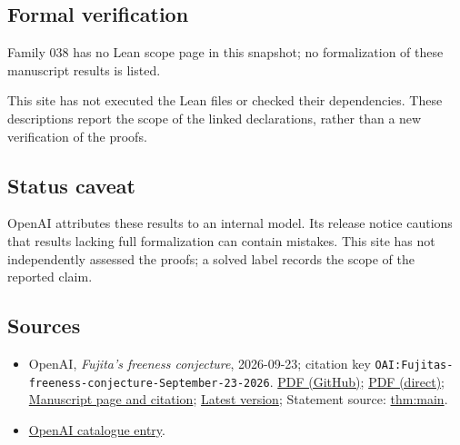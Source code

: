 \documentclass[11pt]{article}
\begin{document}
\subsection{Formal verification}
Family 038 has no Lean scope page in this snapshot; no formalization of these manuscript results is listed.

This site has not executed the Lean files or checked their dependencies. These descriptions report the scope of the linked declarations, rather than a new verification of the proofs.

\subsection{Status caveat}
OpenAI attributes these results to an internal model. Its release notice cautions that results lacking full formalization can contain mistakes. This site has not independently assessed the proofs; a solved label records the scope of the reported claim.

\subsection{Sources}
\begin{itemize}
\item OpenAI, \emph{Fujita's freeness conjecture}, 2026-09-23; citation key \texttt{OAI:Fujitas-freeness-conjecture-September-23-2026}. \href{https://github.com/openai/math/blob/adc7f1241b42e322a6451854ab7e4b4c146bf78a/preprints/Fujitas-freeness-conjecture-September-23-2026/Fujitas-freeness-conjecture-September-23-2026.pdf}{PDF (GitHub)}; \href{https://github.com/openai/math/raw/adc7f1241b42e322a6451854ab7e4b4c146bf78a/preprints/Fujitas-freeness-conjecture-September-23-2026/Fujitas-freeness-conjecture-September-23-2026.pdf}{PDF (direct)}; \href{https://github.com/openai/math/blob/adc7f1241b42e322a6451854ab7e4b4c146bf78a/preprints/Fujitas-freeness-conjecture-September-23-2026/README.md}{Manuscript page and citation}; \href{https://github.com/openai/math/blob/main/preprints/Fujitas-freeness-conjecture-September-23-2026/Fujitas-freeness-conjecture-September-23-2026.pdf}{Latest version}; Statement source: \href{https://github.com/openai/math/blob/adc7f1241b42e322a6451854ab7e4b4c146bf78a/preprints/Fujitas-freeness-conjecture-September-23-2026/build/main.tex\#L70}{thm:main}.
\item \href{https://github.com/openai/math/blob/adc7f1241b42e322a6451854ab7e4b4c146bf78a/CONTENTS.md}{OpenAI catalogue entry}.
\end{itemize}
\end{document}
